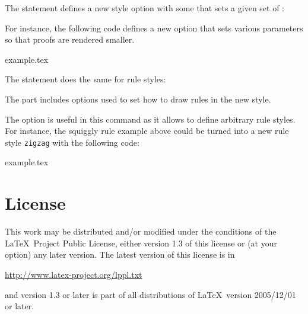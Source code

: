 \documentclass{l3doc}
\newenvironment{example}{%
  \VerbatimEnvironment
  \begin{VerbatimOut}{example.tex}}{%
  \end{VerbatimOut}
  \begin{center}
  \begin{minipage}{.4\textwidth}
    
  \end{minipage}%
  \begin{minipage}{.6\textwidth}
    \small\VerbatimInput[gobble=0]{example.tex}
  \end{minipage}%
  \end{center}
}
\begin{document}
\DescribeMacro{\ebproofnewstyle}
The statement  defines a new style option with some
 that sets a given set of :
\begin{syntax}
\end{syntax}
For instance, the following code defines a new option  that sets
various parameters so that proofs are rendered smaller.
\begin{example}
  \begin{prooftree}[small]
     
  \end{prooftree}
\end{example}

\DescribeMacro{\ebproofnewrulestyle}
The statement  does the same for rule styles:
\begin{syntax}
\end{syntax}
The  part includes options used to set how to draw rules in
the new style.

The option  is useful in this command as it allows to
define arbitrary rule styles.
For instance, the squiggly rule example above could be turned into a new
rule style \texttt{zigzag} with the following code:
\begin{example}
  \begin{prooftree}
  \end{prooftree}
\end{example}


\section{License}

This work may be distributed and/or modified under the
conditions of the \LaTeX\ Project Public License, either version 1.3
of this license or (at your option) any later version.
The latest version of this license is in
\begin{center}
  \url{http://www.latex-project.org/lppl.txt}
\end{center}
and version 1.3 or later is part of all distributions of \LaTeX\
version 2005/12/01 or later.
\end{document}
